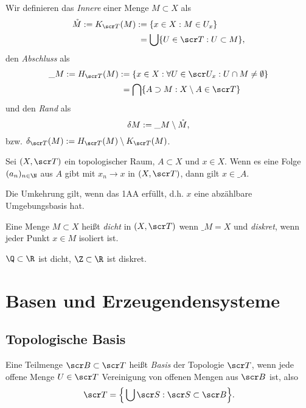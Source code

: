 \begin{df}
	Wir definieren das \emph{Innere} einer Menge $M \subset X$ als
	\begin{align*}
		\mathring M
		:= K_{\scr T}(M)
		&:= \{ x \in X : M \in U_x \} \\
		&\;= \bigcup \{ U \in \scr T : U \subset M \},
	\end{align*}
	den \emph{Abschluss} als
	\begin{align*}
		\_{M}
		:= H_{\scr T}(M)
		&:= \{ x \in X : \forall U \in \scr U_x : U \cap M \neq \emptyset \} \\
		&\;=  \bigcap \{ A \supset M : X \setminus A \in \scr T \}
	\end{align*}
	und den \emph{Rand} als
	\[
		\delta M
		:= \_ M \setminus \mathring M,
	\]
	bzw. $\delta_{\scr T}(M) := H_{\scr T}(M) \setminus K_{\scr T}(M)$.
\end{df}

\begin{st}
	Sei $(X, \scr T)$ ein topologischer Raum, $A \subset X$ und $x \in X$.
	Wenn es eine Folge $(a_n)_{n\in\N}$ aus $A$ gibt mit $x_n \to x$ in $(X, \scr T)$, dann gilt $x \in \_A$.

	Die Umkehrung gilt, wenn das 1AA erfüllt, d.h. $x$ eine abzählbare Umgebungsbasis hat.
\end{st}

\begin{df}
	Eine Menge $M \subset X$ heißt \emph{dicht} in $(X, \scr T)$ wenn $\_M = X$ und \emph{diskret}, wenn jeder Punkt $x \in M$ isoliert ist.
\end{df}

\begin{ex}
	$\Q \subset \R$ ist dicht, $\Z \subset \R$ ist diskret.
\end{ex}


\section{Basen und Erzeugendensysteme}


\subsection{Topologische Basis}

\begin{df}[Basis]
	Eine Teilmenge $\scr B \subset \scr T$ heißt \emph{Basis} der Topologie $\scr T$, wenn jede offene Menge $U \in \scr T$ Vereinigung von offenen Mengen aus $\scr B$ ist, also
	\[
		\scr T = \Big\{ \bigcup \scr S : \scr S \subset \scr B \Big\}.
	\]
\end{df}

